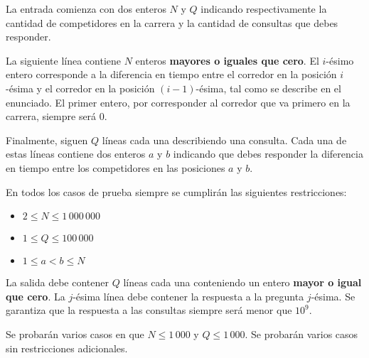 \documentclass{oci}
\begin{document}
\begin{inputDescription}
  La entrada comienza con dos enteros $N$ y $Q$ indicando respectivamente la cantidad de
  competidores en la carrera y la cantidad de consultas que debes responder.

  La siguiente línea contiene $N$ enteros \textbf{mayores o iguales que cero}.
  El $i$-ésimo entero corresponde a la diferencia en tiempo entre el corredor en la posición
  $i$-ésima y el corredor en la posición $(i-1)$-ésima, tal como se describe en el enunciado.
  El primer entero, por corresponder al corredor que va primero en la carrera, siempre será 0.
  
  Finalmente, siguen $Q$ líneas cada una describiendo una consulta.
  Cada una de estas líneas contiene dos enteros $a$ y $b$ indicando que debes
  responder la diferencia en tiempo entre los competidores en las posiciones $a$ y $b$.

  En todos los casos de prueba siempre se cumplirán las siguientes restricciones:
  \begin{itemize}
  \item $2 \leq N \leq 1\,000\,000$
  \item $1 \leq Q \leq 100\,000$
  \item $1 \leq a < b \leq N$
  \end{itemize}
\end{inputDescription}

\begin{outputDescription}
  La salida debe contener $Q$ líneas cada una conteniendo un entero \textbf{mayor o igual que cero}.
  La $j$-ésima línea debe contener la respuesta a la pregunta $j$-ésima.
  Se garantiza que la respuesta a las consultas siempre será menor que $10^9$.
\end{outputDescription}

\begin{scoreDescription}
  Se probarán varios casos en que $N \leq 1\,000$ y $Q \leq 1\,000$.
  Se probarán varios casos sin restricciones adicionales.
\end{scoreDescription}

\begin{sampleDescription}
\end{sampleDescription}
\end{document}
